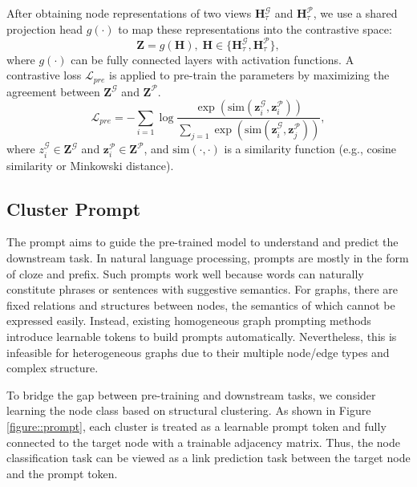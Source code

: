 After obtaining node representations of two views $\bm H_\tau^\mathcal{G}$ and $\bm H_\tau^\mathcal{P}$, we use a shared projection head $g(\cdot)$ to map these representations into the contrastive space:
\begin{equation}\label{equ::project}
	\bm Z = g(\bm H), \; \bm H \in \{\bm H_\tau^\mathcal{G},\bm H_\tau^\mathcal{P}\},
\end{equation}
where $g(\cdot)$ can be fully connected layers with activation functions. A contrastive loss $\mathcal{L}_{pre}$ is applied to pre-train the parameters by maximizing the agreement between $\bm Z^{\mathcal{G}}$ and $\bm Z^{\mathcal{P}}$.
\begin{equation}\label{equ::pretrain}
    \mathcal{L}_{pre} = -\sum_{i=1} \log \frac{\exp(\text{sim}(\bm z_i^{\mathcal{G}},\bm z_i^{\mathcal{P}}))}{\sum_{j=1}\exp(\text{sim}(\bm z_i^{\mathcal{G}},\bm z_j^{\mathcal{P}}))},
\end{equation}
where $z_i^{\mathcal{G}} \in \bm Z^{\mathcal{G}}$ and $\bm z_i^{\mathcal{P}} \in \bm Z^{\mathcal{P}}$, and $\text{sim}(\cdot,\cdot)$ is a similarity function (e.g., cosine similarity or Minkowski distance).

\subsection{Cluster Prompt}\label{sec::prompt}

The prompt aims to guide the pre-trained model to understand and predict the downstream task. In natural language processing, prompts are mostly in the form of cloze and prefix. Such prompts work well because words can naturally constitute phrases or sentences with suggestive semantics. For graphs, there are fixed relations and structures between nodes, the semantics of which cannot be expressed easily. Instead, existing homogeneous graph prompting methods \cite{GPPT,All} introduce learnable tokens to build prompts automatically. Nevertheless, this is infeasible for heterogeneous graphs due to their multiple node/edge types and complex structure.

To bridge the gap between pre-training and downstream tasks, we consider learning the node class based on structural clustering. As shown in Figure \ref{figure::prompt}, each cluster is treated as a learnable prompt token and fully connected to the target node with a trainable adjacency matrix. Thus, the node classification task can be viewed as a link prediction task between the target node and the prompt token.


